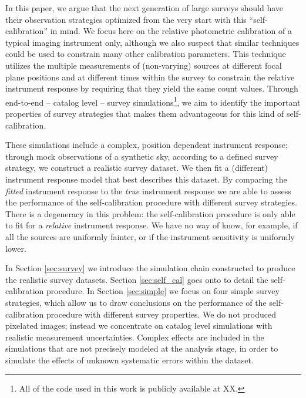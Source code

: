 \documentclass[manuscript]{aastex}
\begin{document}
In this paper, we argue that the next generation of large surveys should have their observation strategies optimized from the very start with this ``self-calibration'' in mind. We focus here on the relative photometric calibration of a typical imaging instrument only, although we also suspect that similar techniques could be used to constrain many other calibration parameters. This technique utilizes the multiple measurements of (non-varying) sources at different focal plane positions and at different times within the survey to constrain the relative instrument response by requiring that they yield the same count values. Through end-to-end -- catalog level -- survey simulations\footnote{All of the code used in this work is publicly available at XX.}, we aim to identify the important properties of survey strategies that makes them advantageous for this kind of self-calibration. 

These simulations include a complex, position dependent instrument response; through mock observations of a synthetic sky, according to a defined survey strategy, we construct a realistic survey dataset. We then fit a (different) instrument response model that best describes this dataset. By comparing the \textit{fitted} instrument response to the \textit{true} instrument response we are able to assess the performance of the self-calibration procedure with different survey strategies. There is a degeneracy in this problem: the self-calibration procedure is only able to fit for a \textit{relative} instrument response. We have no way of know, for example, if all the sources are uniformly fainter, or if the instrument sensitivity is uniformly lower. 

In Section \ref{sec:survey} we introduce the simulation chain constructed to produce the realistic survey datasets. Section \ref{sec:self_cal} goes onto to detail the self-calibration procedure. In Section \ref{sec:simple} we focus on four simple survey strategies, which allow us to draw conclusions on the performance of the self-calibration procedure with different survey properties. We do not produced pixelated images; instead we concentrate on catalog level simulations with realistic measurement uncertainties. Complex effects are included in the simulations that are not  precisely modeled at the analysis stage, in order to simulate the effects of unknown systematic errors within the dataset.
\end{document}
